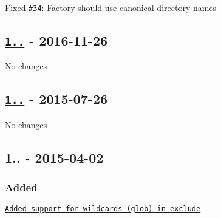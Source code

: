 \begin{DoxyItemize}
\item Fixed \href{https://github.com/sebastianbergmann/php-file-iterator/issues/34}{\tt \#34}\+: Factory should use canonical directory names
\end{DoxyItemize}

\subsection*{\href{https://github.com/sebastianbergmann/php-file-iterator/compare/1.4.1...1.4.2}{\tt 1..} -\/ 2016-\/11-\/26}

No changes

\subsection*{\href{https://github.com/sebastianbergmann/php-file-iterator/compare/1.4.0...1.4.1}{\tt 1..} -\/ 2015-\/07-\/26}

No changes

\subsection*{1.. -\/ 2015-\/04-\/02}

\subsubsection*{Added}


\begin{DoxyItemize}
\item \href{https://github.com/sebastianbergmann/php-file-iterator/pull/23}{\tt Added support for wildcards (glob) in exclude} 
\end{DoxyItemize}